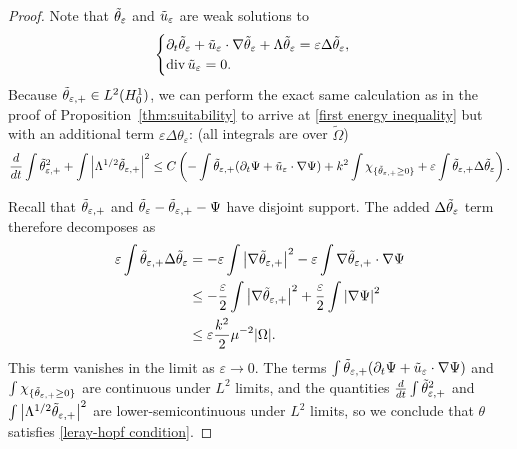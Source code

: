 \documentclass[11pt]{amsart}
\theoremstyle{remark}
\theoremstyle{definition}
\newcommand{\eps}{\varepsilon}
\newcommand{\paren}[1]{\left( #1 \right)}
\newcommand{\abs}[1]{\left\lvert #1 \right\rvert}
\newcommand{\del}{\partial}
\newcommand{\grad}{\nabla}
\newcommand{\ddt}{\frac{d}{dt}}
\renewcommand{\div}{\operatorname{div}}
\newcommand{\Laplace}{\Delta}
\newcommand{\indic}[1]{\chi_{\{#1\}}}
\begin{document}
\begin{proof}
Note that $\thetae$ and $\ue$ are weak solutions to
\begin{equation} \label{eq:viscous linear}
\begin{cases}
\del_t \thetae + \ue \cdot \grad \thetae + \Lambda \thetae = \eps \Laplace \thetae, \\
\div \ue = 0.
\end{cases}
\end{equation}
Because $\thetaep \in L^2(H_0^1)$, we can perform the exact same calculation as in the proof of Proposition~\ref{thm:suitability} to arrive at \eqref{first energy inequality} but with an additional term $\eps \Laplace \theta_\eps$: (all integrals are over $\tilde{\Omega}$)
\begin{equation*} \ddt \int \thetaep^2 + \int \abs{\Lambda^{1/2} \thetaep}^2 \leq C \paren{ - \int \thetaep (\del_t\Psi+\ue\cdot\grad\Psi) + k^2 \int \indic{\thetaep\geq 0}  + \eps \int \thetaep \Laplace \thetae}.
\end{equation*}

Recall that $\thetaep$ and $\thetae - \thetaep - \Psi$ have disjoint support.  The added $\Laplace\thetae$ term therefore decomposes as
\begin{align*} 
\eps \int \thetaep \Laplace \thetae &= -\eps \int \abs{\grad \thetaep}^2 - \eps \int \grad \thetaep \cdot \grad \Psi
\\ &\leq - \frac{\eps}{2} \int \abs{\grad\thetaep}^2 + \frac{\eps}{2} \int \abs{\grad\Psi}^2
\\ &\leq \eps \frac{k^2}{2} \mu^{-2} |\Omega|.
\end{align*}
This term vanishes in the limit as $\eps \to 0$.  The terms $\int \thetaep (\del_t\Psi+\ue\cdot\grad\Psi)$ and $\int \indic{\thetaep\geq 0}$ are continuous under $L^2$ limits, and the quantities $\ddt \int \thetaep^2$ and $\int \abs{\Lambda^{1/2} \thetaep}^2$ are lower-semicontinuous under $L^2$ limits, so we conclude that $\theta$ satisfies \eqref{leray-hopf condition}.  


\end{proof}
\end{document}
